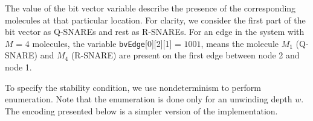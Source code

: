 %
%
%
%
%
% 
%
%
%
%
%
%
%
%
%
The value of the bit vector variable describe the presence of the corresponding molecules at that particular location. 
%
For clarity, we consider the first part of the bit vector as Q-SNAREs and rest as R-SNAREs.
%
For an edge in the system with $M$ = 4 molecules, the variable \texttt{bvEdge}[0][2][1] = $1001$, means the molecule  $M_{1}$ (Q-SNARE) and $M_{4}$ (R-SNARE) are present on the first edge between node 2 and node 1.

To specify the stability condition, we use nondeterminism to perform enumeration.
%
%
%
%
Note that the enumeration is done only for an unwinding depth $w$.
%
The encoding presented below is a simpler version of the implementation. 
